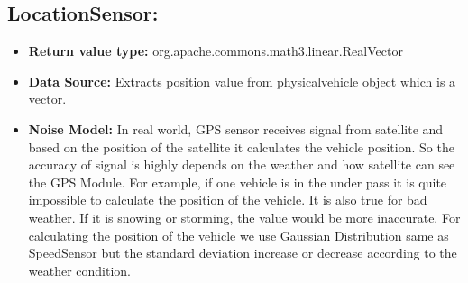 \documentclass[]{article}
\begin{document}
    \subsection{LocationSensor:}
        \begin{itemize}
        \item \textbf{Return value type:} org.apache.commons.math3.linear.RealVector
        \item \textbf{Data Source:} Extracts position value from physicalvehicle object which is a vector.
        \item \textbf{Noise Model:} In real world, GPS sensor receives signal from satellite and based on the position of the satellite it calculates the vehicle position. So the accuracy of signal is highly depends on the weather and how satellite can see the GPS Module. For example, if one vehicle is in the under pass it is quite impossible to calculate the position of the vehicle. It is also true for bad weather. If it is snowing or storming, the value would be more inaccurate. For calculating the position of the vehicle we use Gaussian Distribution same as SpeedSensor but the standard deviation increase or decrease according to the weather condition.
        \end{itemize}
\end{document}

